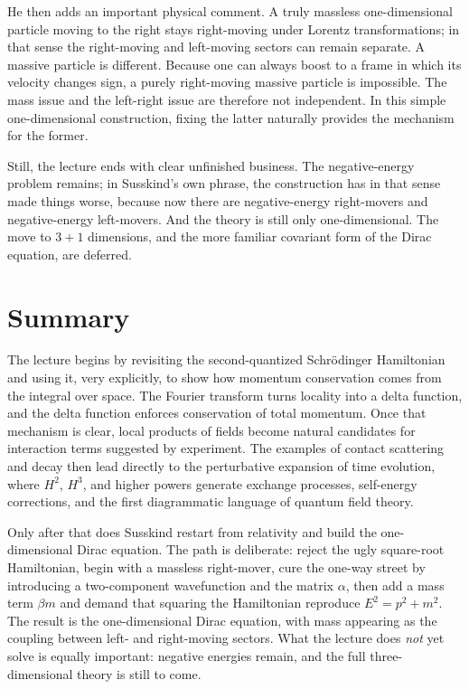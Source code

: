 He then adds an important physical comment. A truly massless one-dimensional particle moving to the right stays right-moving under Lorentz transformations; in that sense the right-moving and left-moving sectors can remain separate. A massive particle is different. Because one can always boost to a frame in which its velocity changes sign, a purely right-moving massive particle is impossible. The mass issue and the left-right issue are therefore not independent. In this simple one-dimensional construction, fixing the latter naturally provides the mechanism for the former.

Still, the lecture ends with clear unfinished business. The negative-energy problem remains; in Susskind's own phrase, the construction has in that sense made things worse, because now there are negative-energy right-movers and negative-energy left-movers. And the theory is still only one-dimensional. The move to \(3+1\) dimensions, and the more familiar covariant form of the Dirac equation, are deferred.

\section{Summary}

The lecture begins by revisiting the second-quantized Schr\"odinger Hamiltonian and using it, very explicitly, to show how momentum conservation comes from the integral over space. The Fourier transform turns locality into a delta function, and the delta function enforces conservation of total momentum. Once that mechanism is clear, local products of fields become natural candidates for interaction terms suggested by experiment. The examples of contact scattering and decay then lead directly to the perturbative expansion of time evolution, where \(H^2\), \(H^3\), and higher powers generate exchange processes, self-energy corrections, and the first diagrammatic language of quantum field theory.

Only after that does Susskind restart from relativity and build the one-dimensional Dirac equation. The path is deliberate: reject the ugly square-root Hamiltonian, begin with a massless right-mover, cure the one-way street by introducing a two-component wavefunction and the matrix \(\alpha\), then add a mass term \(\beta m\) and demand that squaring the Hamiltonian reproduce \(E^2=p^2+m^2\). The result is the one-dimensional Dirac equation, with mass appearing as the coupling between left- and right-moving sectors. What the lecture does \emph{not} yet solve is equally important: negative energies remain, and the full three-dimensional theory is still to come.